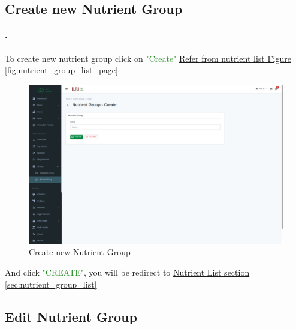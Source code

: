 \subsection{Create new Nutrient Group}\label{sec:nutrient_group_create}
\setcounter{stepcounter}{1}
\paragraph{.}To create new nutrient group click on \textcolor{ForestGreen}{"Create"} \hyperref[fig:nutrient_group_list_page]{Refer from nutrient list Figure \ref{fig:nutrient_group_list_page}}
\begin{figure}[h!]
  	\includegraphics[width=15cm]{screenshots/nutrient_group_create_page.png}
  	\caption{Create new Nutrient Group}
  	\label{fig:nutrient_group_create_page}
\end{figure}
And click \textcolor{ForestGreen}{"CREATE"}, you will be redirect to  \hyperref[sec:nutrient_group_list]{Nutrient List section \ref{sec:nutrient_group_list}}

\subsection{Edit Nutrient Group}\label{sec:nutrient_group_edit}
\setcounter{stepcounter}{1}
